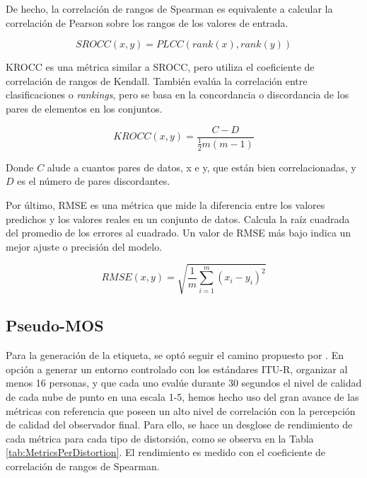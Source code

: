 De hecho, la correlación de rangos de Spearman es equivalente a calcular 
la correlación de Pearson sobre los rangos de los valores de entrada.

\begin{equation}
SROCC(x,y) = PLCC(rank(x), rank(y))
\label{eq:SROCCasPLCC}
\end{equation}

KROCC es una métrica similar a SROCC, pero utiliza el coeficiente de correlación 
de rangos de Kendall. También evalúa la correlación entre clasificaciones o \emph{rankings},
pero se basa en la concordancia o discordancia de los pares de elementos en los 
conjuntos.

\begin{equation}
  KROCC(x,y) = \frac{C-D}{\frac{1}{2} m (m-1)}
\label{eq:KROCC}
\end{equation}

Donde $C$ alude a cuantos pares de datos, x e y, que están bien correlacionadas, 
y $D$ es el número de pares discordantes.  

Por último, RMSE es una métrica que mide la diferencia entre los valores 
predichos y los valores reales en un conjunto de datos. 
Calcula la raíz cuadrada del promedio de los errores al cuadrado. 
Un valor de RMSE más bajo indica un mejor ajuste o precisión del modelo.

\begin{equation}
  RMSE(x,y) = \sqrt{\frac{1}{m}\sum_{i=1}^m (x_i - y_i)^2}
\label{eq:RMSE}
\end{equation}

\subsection{Pseudo-MOS}
Para la generación de la etiqueta, se optó seguir el camino propuesto por \cite{ResSCNN}. 
En opción a generar un entorno controlado con los estándares ITU-R\cite{ITU-R.2012, ITU-R.2021}, 
organizar al menos 16 personas, y que cada uno evalúe durante 30 segundos el nivel 
de calidad de cada nube de punto en una escala 1-5, hemos hecho uso del gran 
avance de las métricas con referencia que poseen un alto nivel de correlación con 
la percepción de calidad del observador final. 
Para ello, se hace un desglose de rendimiento de cada métrica para cada tipo 
de distorsión, como se observa en la Tabla \ref{tab:MetricsPerDistortion}. El 
rendimiento es medido con el coeficiente de correlación de rangos de Spearman.

